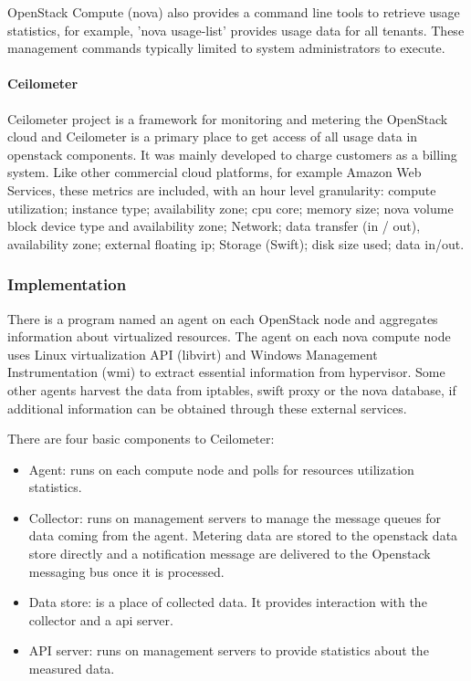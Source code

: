 \documentclass{sig-alternate-05-2015}
\newcommand{\task}[1]{\smallskip\todo[inline, color=gray!20]{#1}}
\begin{document}
OpenStack Compute (nova) also provides a command line tools to retrieve usage statistics, for example, 'nova usage-list' provides usage data for all tenants. These management commands typically limited to system administrators to execute.

\paragraph{Ceilometer}

Ceilometer project is a framework for monitoring and metering the OpenStack cloud and Ceilometer is a primary place to get access of all usage data in openstack components. It was mainly developed to charge customers as a billing system. Like other commercial cloud platforms, for example Amazon Web Services, these metrics are included, with an hour level granularity:
  compute utilization;
   instance type;
   availability zone;
   cpu core;
   memory size;
   nova volume block device type and availability zone;
   Network;
   data transfer (in / out), availability zone;
   external floating ip;
   Storage (Swift);
   disk size used;
   data in/out.

\subsubsection{Implementation}

\task{Wrong section heading}

There is a program named an agent on each OpenStack node and aggregates information about virtualized resources. The agent on each nova compute node uses Linux virtualization API (libvirt) and Windows Management Instrumentation (wmi) to extract essential information from hypervisor. Some other agents harvest the data from iptables, swift proxy or the nova database, if additional information can be obtained through these external services.

There are four basic components to Ceilometer:

\begin{itemize}
  \item Agent: runs on each compute node and polls for resources utilization statistics.
  \item Collector: runs on management servers to manage the message queues for data coming from the agent. Metering data are stored to the openstack data store directly and a notification message are delivered to the Openstack messaging bus once it is processed.
  \item Data store: is a place of collected data. It provides interaction with the collector and a api server.
  \item API server: runs on management servers to provide statistics about the measured data.
\end{itemize}
\end{document}
